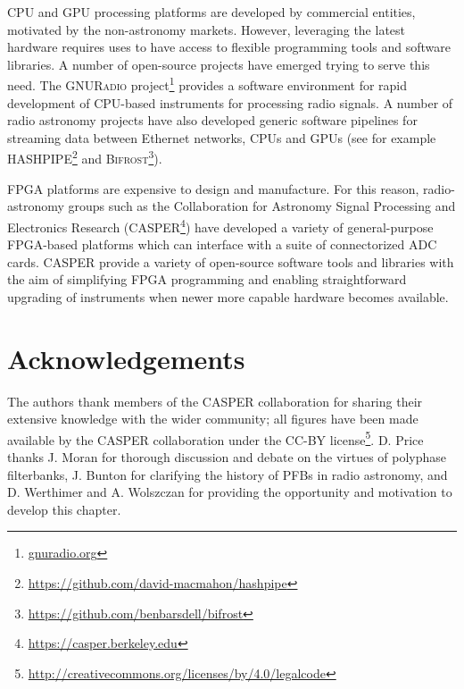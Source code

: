 \documentclass{ws-rv961x669}
\begin{document}
CPU and GPU processing platforms are developed by commercial entities, motivated by the non-astronomy markets. However, leveraging the latest hardware requires uses to have access to flexible programming tools and software libraries. A number of open-source projects have emerged trying to serve this need.
The \textsc{GNURadio} project\footnote{\url{gnuradio.org}} provides a software environment for rapid development of CPU-based instruments for processing radio signals.
A number of radio astronomy projects have also developed generic software pipelines for streaming data between Ethernet networks, CPUs and GPUs (see for example \textsc{HASHPIPE}\footnote{\url{https://github.com/david-macmahon/hashpipe}} and \textsc{Bifrost}\footnote{\url{https://github.com/benbarsdell/bifrost}}).

FPGA platforms are expensive to design and manufacture. For this reason, radio-astronomy groups such as the Collaboration for Astronomy Signal Processing and Electronics Research (CASPER\footnote{\url{https://casper.berkeley.edu}}) have developed a variety of general-purpose FPGA-based platforms which can interface with a suite of connectorized ADC cards.
CASPER provide a variety of open-source software tools and libraries with the aim of simplifying FPGA programming and enabling straightforward upgrading of instruments when newer more capable hardware becomes available.



\section{Acknowledgements}

The authors thank members of the CASPER collaboration for sharing their extensive knowledge with the wider community; all figures have been made available by the CASPER collaboration under the CC-BY license\footnote{\url{http://creativecommons.org/licenses/by/4.0/legalcode}}. D. Price thanks J. Moran for thorough discussion and debate on the virtues of polyphase filterbanks, J. Bunton for clarifying the history of PFBs in radio astronomy, and D. Werthimer and A. Wolszczan for providing the opportunity and motivation to develop this chapter. 



\end{document}
